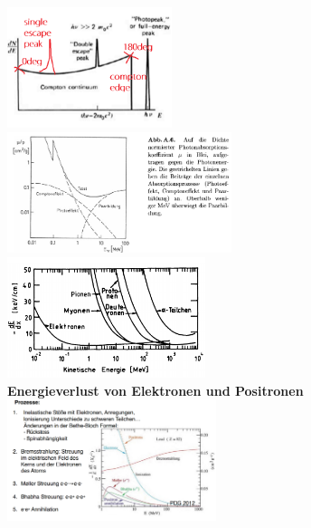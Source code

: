 \documentclass[10pt,twoside,a4paper]{article}
\begin{document}
\begin{multicols*}{3}
\includegraphics[width=.25\textwidth, height=100pt]{compton_edge}\\
\includegraphics[width=.33\textwidth, height=100pt]{abs_koeff}\\
\includegraphics[width=.33\textwidth, height=100pt]{bethe_bloc}\\
\textbf{Energieverlust von Elektronen und Positronen}\\
\includegraphics[width=.33\textwidth, height=100pt]{energyloss_e}



\end{multicols*}
\end{document}
